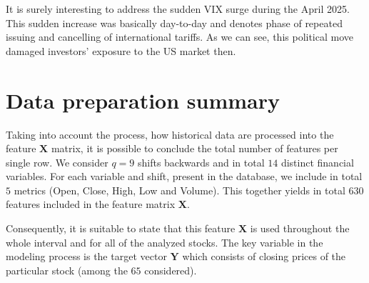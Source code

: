 It is surely interesting to address the sudden VIX surge during the April 2025. This sudden increase was basically day-to-day and denotes 
phase of repeated issuing and cancelling of international tariffs. As we can see, this political move damaged investors' exposure to the US market then.

\section{Data preparation summary}

Taking into account the process, how historical data are processed into the feature $\mathbf{X}$ matrix, it is possible to conclude the total number of features per single row.
We consider $q = 9$ shifts backwards and in total $14$ distinct financial variables. For each variable and shift, present in the database, we include in total $5$ metrics (Open, Close, High, Low and Volume).
This together yields in total $630$ features included in the feature matrix $\mathbf{X}$.

Consequently, it is suitable to state that this feature $\mathbf{X}$ is used throughout the whole interval and for all of the analyzed stocks. The key variable in the modeling process is the target vector $\mathbf{Y}$
which consists of closing prices of the particular stock (among the $65$ considered).
